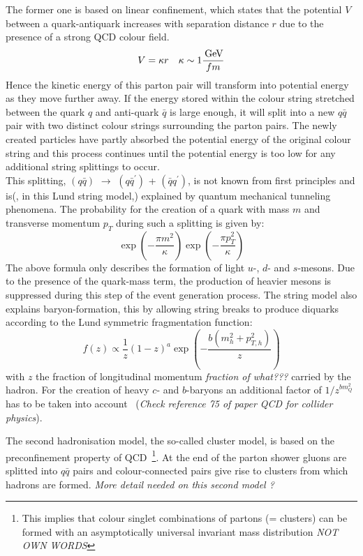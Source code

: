 The former one is based on linear confinement, which states that the potential $V$ between a quark-antiquark increases with separation distance $r$ due to the presence of a strong QCD colour field.%
\begin{equation}\label{eq::VQCD}
 V = \kappa r ~~~ \kappa \sim 1 \dfrac{\, \mathrm{GeV}}{fm}
\end{equation}
Hence the kinetic energy of this parton pair will transform into potential energy as they move further away. If the energy stored within the colour string stretched between the quark $q$ and anti-quark $\bar{q}$ is large enough, it will split into a new $q\bar{q}$ pair with two distinct colour strings surrounding the parton pairs. The newly created particles have partly absorbed the potential energy of the original colour string and this process continues until the potential energy is too low for any additional string splittings to occur.
\\
This splitting, $(q\bar{q})$ $\rightarrow$ $(q\bar{q}^{'})$ + $(\bar{q}q^{'})$, is not known from first principles and is(, in this Lund string model,) explained by quantum mechanical tunneling phenomena. The probability for the creation of a quark with mass $m$ and transverse momentum $p_{T}$ during such a splitting is given by:
\begin{equation}
 \exp \left( -\frac{\pi m^{2}}{\kappa} \right) \exp \left(-\frac{\pi p_{T}^{2}}{\kappa} \right)
\end{equation}
The above formula only describes the formation of light $u$-, $d$- and $s$-mesons. Due to the presence of the quark-mass term, the production of heavier mesons is suppressed during this step of the event generation process. The string model also explains baryon-formation, this by allowing string breaks to produce diquarks according to the Lund symmetric fragmentation function:
\begin{equation}
 f(z) \propto \frac{1}{z} (1-z)^{a} \exp \left( - \frac{b(m_{h}^{2} + p_{T,h}^{2})}{z} \right)
\end{equation}
with $z$ the fraction of longitudinal momentum \textit{fraction of what???} carried by the hadron. For the creation of heavy $c$- and $b$-baryons an additional factor of $1/z^{bm_{Q}^{2}}$ has to be taken into account~\cite{} (\textit{Check reference 75 of paper QCD for collider physics}).

The second hadronisation model, the so-called cluster model, is based on the preconfinement property of QCD~\footnote{This implies that colour singlet combinations of partons (= clusters) can be formed with an asymptotically universal invariant mass distribution \textit{NOT OWN WORDS}}. At the end of the parton shower gluons are splitted into $q\bar{q}$ pairs and colour-connected pairs give rise to clusters from which hadrons are formed. \textit{More detail needed on this second model ?}

